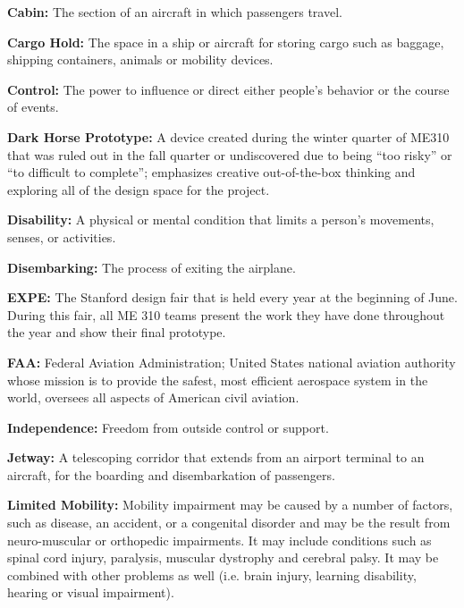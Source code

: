   \item  \textbf{Cabin:} The section of an aircraft in which passengers travel. 

 \item  \textbf{Cargo Hold:}  The space in a ship or aircraft for storing cargo such as baggage, shipping containers, animals or mobility devices. 

  \item \textbf{Control:} The power to influence or direct either people's behavior or the course of events.

  \item \textbf{Dark Horse Prototype:} A device created during the winter quarter of ME310 that was ruled out in the fall quarter or undiscovered due to being “too risky” or “to difficult to complete”; emphasizes creative out-of-the-box thinking and exploring all of the design space for the project. 

  \item \textbf{Disability:} A physical or mental condition that limits a person's movements, senses, or activities.

\item \textbf{Disembarking:} The process of exiting the airplane.

  \item \textbf{EXPE:} The Stanford design fair that is held every year at the beginning of June. During this fair, all ME 310 teams present the work they have done throughout the year and show their final prototype.

  \item \textbf{FAA:} Federal Aviation Administration; United States national aviation authority whose mission is to provide the safest, most efficient aerospace system in the world, oversees all aspects of American civil aviation.

  \item \textbf{Independence:} Freedom from outside control or support.

\item \textbf{Jetway:} A telescoping corridor that extends from an airport terminal to an aircraft, for the boarding and disembarkation of passengers.

  \item \textbf{Limited Mobility:} Mobility impairment may be caused by a number of factors, such as disease, an accident, or a congenital disorder and may be the result from neuro-muscular or orthopedic impairments. It may include conditions such as spinal cord injury, paralysis, muscular dystrophy and cerebral palsy. It may be combined with other problems as well (i.e. brain injury, learning disability, hearing or visual impairment).

